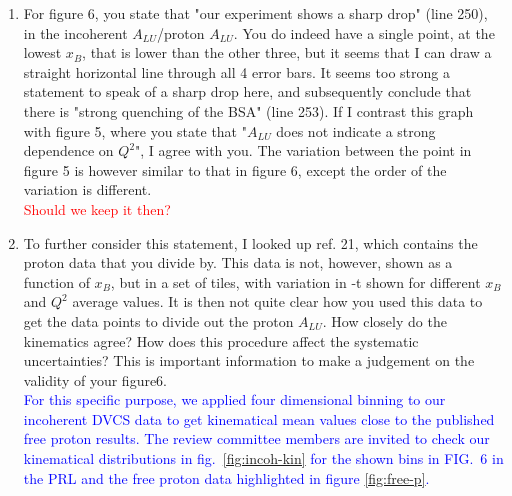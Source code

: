 \documentclass[a4paper,11pt,twoside]{article}
\begin{document}
\begin{enumerate}
  
\item    For figure 6, you state that "our experiment shows a sharp drop" (line 
   250), in the incoherent $A_{LU}$/proton $A_{LU}$. You do indeed have a 
      single point, at the lowest $x_B$, that is lower than the other three, 
      but it seems that I can draw a straight horizontal line through all 4 
      error bars. It seems too strong a statement to speak of a sharp drop 
      here, and subsequently conclude that there is "strong quenching of the 
      BSA" (line 253). If I contrast this graph with figure 5, where you state 
      that "$A_{LU}$ does not indicate a strong dependence on $Q^2$", I agree 
      with you. The variation between the point in figure 5 is however similar 
      to that in figure 6, except the order of the variation is different.\\ 
      \textcolor{red}{Should we keep it then? }



\item    To further consider this statement, I looked up ref. 21, which 
   contains the proton data that you divide by. This data is not, however, 
      shown as a function of $x_B$, but in a set of tiles, with variation in -t 
      shown for different $x_B$ and $Q^2$ average values. It is then not quite 
      clear how you used this data to get the data points to divide out the 
      proton $A_{LU}$. How closely do the kinematics agree? How does this 
      procedure affect the systematic uncertainties? This is important 
      information to make a judgement on the validity of your figure6.\\
   \textcolor{blue}{For this specific purpose, we applied four dimensional 
      binning to our incoherent DVCS data to get kinematical mean values close 
      to the published free proton results. The review committee members are 
      invited to check our kinematical distributions in 
      fig.~\ref{fig:incoh-kin} for the shown bins in FIG.~6 in the PRL and the 
      free proton data highlighted in figure \ref{fig:free-p}. }


\end{enumerate}
\end{document}
